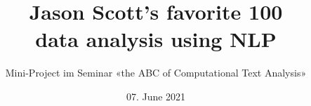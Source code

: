 \title{\vspace{-2cm}Jason Scott's favorite 100\\data analysis using NLP}
\subtitle{Mini-Project im Seminar «the ABC of Computational Text Analysis»}
\date{\small{07. June 2021}}
\maketitle




\setcounter{tocdepth}{3}
\tableofcontents

\newpage
{}